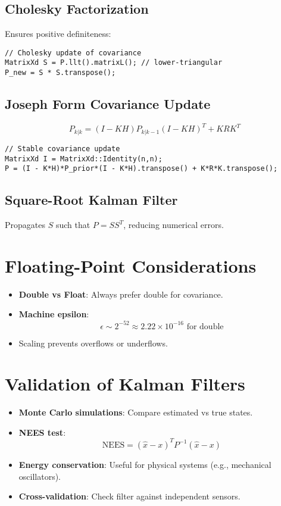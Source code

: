 \documentclass[11pt]{article}
\begin{document}
\subsection{Cholesky Factorization}
Ensures positive definiteness:
\begin{lstlisting}
// Cholesky update of covariance
MatrixXd S = P.llt().matrixL(); // lower-triangular
P_new = S * S.transpose();
\end{lstlisting}

\subsection{Joseph Form Covariance Update}
\[
P_{k|k} = (I-KH) P_{k|k-1} (I-KH)^T + K R K^T
\]
\begin{lstlisting}
// Stable covariance update
MatrixXd I = MatrixXd::Identity(n,n);
P = (I - K*H)*P_prior*(I - K*H).transpose() + K*R*K.transpose();
\end{lstlisting}

\subsection{Square-Root Kalman Filter}
Propagates $S$ such that $P = S S^T$, reducing numerical errors.

\section{Floating-Point Considerations}
\begin{itemize}
    \item \textbf{Double vs Float}: Always prefer double for covariance.
    \item \textbf{Machine epsilon}:
    \[
    \epsilon \sim 2^{-52} \approx 2.22 \times 10^{-16} \text{ for double}
    \]
    \item Scaling prevents overflows or underflows.
\end{itemize}

\section{Validation of Kalman Filters}
\begin{itemize}
    \item \textbf{Monte Carlo simulations}: Compare estimated vs true states.
    \item \textbf{NEES test}:
    \[
    \text{NEES} = (\hat{x}-x)^T P^{-1} (\hat{x}-x)
    \]
    \item \textbf{Energy conservation}: Useful for physical systems (e.g., mechanical oscillators).
    \item \textbf{Cross-validation}: Check filter against independent sensors.
\end{itemize}
\end{document}
